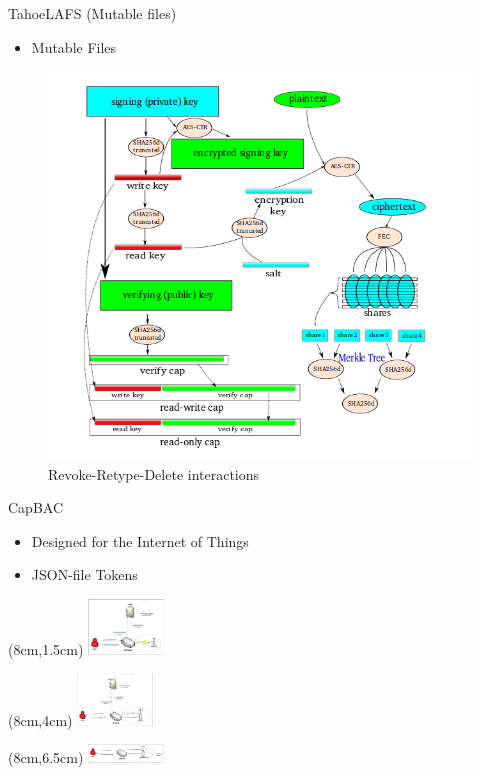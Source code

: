 \documentclass[xcolor=table]{beamer}
\begin{document}
\begin{frame}{TahoeLAFS (Mutable files)}
    \vfill
    \begin{itemize}
    \item Mutable Files
    \end{itemize}
    \vfill
    \begin{figure}
		  \includegraphics[scale=0.5]{img/mutable.png}
		  \caption{Revoke-Retype-Delete interactions}
    \end{figure}
    \vfill
\end{frame}

\begin{frame}{CapBAC}
    \begin{itemize}
    \vfill
    \item Designed for the Internet of Things
    \vfill
    \item JSON-file Tokens
    \vfill
    \end{itemize}
    \begin{textblock*}{2.5cm}(8cm,1.5cm)
        \includegraphics[width=2cm]{img/centralized.png}
    \end{textblock*}
    \begin{textblock*}{2.5cm}(8cm,4cm)
        \includegraphics[width=2cm]{img/CAcentralized.png}
    \end{textblock*}
    \begin{textblock*}{2.5cm}(8cm,6.5cm)
        \includegraphics[width=2cm]{img/distributed.png}
    \end{textblock*}
\end{frame}
\end{document}
